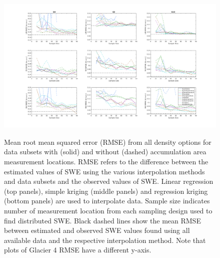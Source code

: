 \documentclass[12pt]{article}
\begin{document}
\begin{landscape}
\begin{figure}[H]
	\centering
	\includegraphics[height =0.9\textwidth]{SubsetInterpSizeCompile_RMS.png}\\
	\caption{Mean root mean squared error (RMSE) from all density options for data subsets with (solid) and without (dashed) accumulation area measurement locations. RMSE refers to the difference between the estimated values of SWE using the various interpolation methods and data subsets and the observed values of SWE. Linear regression (top panels), simple kriging (middle panels) and regression kriging (bottom panels) are used to interpolate data. Sample size indicates number of measurement location from each sampling design used to find distributed SWE. Black dashed lines show the mean RMSE between estimated and observed SWE values found using all available data and the respective interpolation method. Note that plots of Glacier 4 RMSE have a different y-axis.}
	\label{fig:SubsetInterpSizeCompile_RMSE}
\end{figure}

\end{landscape}
\end{document}
